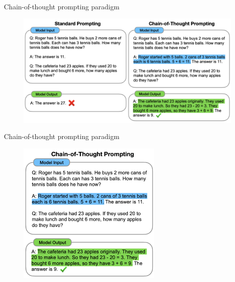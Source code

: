 
\begin{vbframe}{Chain-of-thought prompting paradigm}

\vfill


\begin{figure}
    \centering
    \includegraphics{figure/chain_of_thought.png}\\
\end{figure}

\vfill

\end{vbframe}


\begin{vbframe}{Chain-of-thought prompting paradigm}

\begin{figure}
    \centering
    \includegraphics[height=7cm]{figure/chain_of_thought2.png}
\end{figure}

\end{vbframe}

